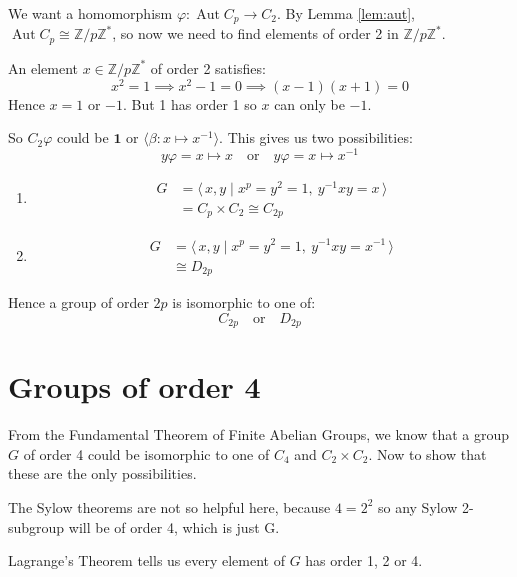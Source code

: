 \documentclass[a4paper, oneside, 12pt, final]{article}
\theoremstyle{definition}
\DeclareMathOperator{\Aut}{Aut}
\newcommand{\Z}{\mathbb{Z}}
\newcommand{\Zn}[1]{\Z/#1\Z}
\begin{document}
We want a homomorphism \(\varphi:\Aut{C_p} \to C_2\).
By Lemma \ref{lem:aut}, \(\Aut{C_p} \cong \Zn{p}^*\), so now we need to find
elements of order 2 in \(\Zn{p}^*\).

An element \(x \in \Zn{p}^*\) of order 2 satisfies:
\[x^2 = 1 \implies x^2 - 1 = 0 \implies (x-1)(x+1) = 0\]
Hence \(x = 1\) or \(-1\).
But 1 has order 1 so \(x\) can only be \(-1\).

So \(C_2\varphi\) could be \(\bm{1}\) or \(\langle \beta:x \mapsto x^{-1}
\rangle\). This gives us two possibilities:
\[y\varphi = x \mapsto x \quad \text{or} \quad y\varphi = x \mapsto x^{-1}\]

\begin{enumerate}
    \item
        \begin{equation*}
        \begin{aligned}
            G &= \langle\, x, y \mid x^p = y^2 = 1,\ y^{-1}xy = x \,\rangle \\
            &= C_p \times C_2 \cong C_{2p}
        \end{aligned}
        \end{equation*}
    \item
        \begin{equation*}
        \begin{aligned}
            G &= \langle\, x, y \mid x^p = y^2 = 1,\ y^{-1}xy = x^{-1}
            \,\rangle \\
            &\cong D_{2p}
        \end{aligned}
        \end{equation*}
\end{enumerate}

Hence a group of order \(2p\) is isomorphic to one of:
\[C_{2p} \quad \text{or} \quad D_{2p}\]

\section{Groups of order 4}
From the Fundamental Theorem of Finite Abelian Groups, we know that a group
\(G\) of order 4 could be isomorphic to one of \(C_4\) and \(C_2 \times C_2\).
Now to show that these are the only possibilities.

The Sylow theorems are not so helpful here, because \(4=2^2\) so any Sylow
2-subgroup will be of order 4, which is just G.

Lagrange's Theorem tells us every element of \(G\) has order 1, 2 or 4.
\end{document}
